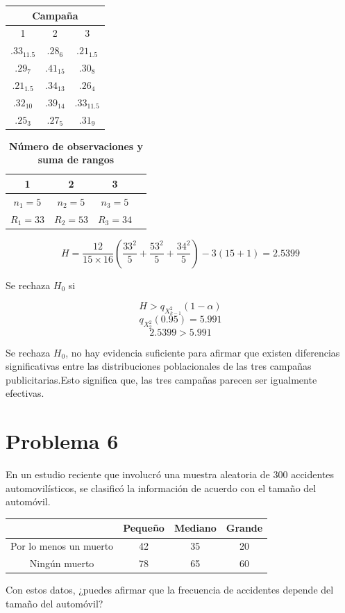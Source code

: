 \documentclass{article}
\begin{document}
\begin{center}
    \begin{tabular}{c |c |c}
        \multicolumn{3}{c}{Campaña}              \\
        \hline
        1            & 2          & 3            \\
        $.33_{11.5}$ & $.28_{6}$  & $.21_{1.5}$  \\
        $.29_{7}$    & $.41_{15}$ & $.30_{8}$    \\
        $.21_{1.5}$  & $.34_{13}$ & $.26_{4}$    \\
        $.32_{10}$   & $.39_{14}$ & $.33_{11.5}$ \\
        $.25_{3}$    & $.27_{5}$  & $.31_{9}$    \\
    \end{tabular}
\end{center}

\begin{table}[ht]
    \centering
    \caption{\textbf{Número de observaciones y suma de rangos}}
    \begin{tabular}{cccc}
        \toprule
        1          & 2          & 3          \\
        \midrule
        $n_1 = 5$  & $n_2 = 5$  & $n_3 = 5$  \\
        $R_1 = 33$ & $R_2 = 53$ & $R_3 = 34$ \\
        \bottomrule
    \end{tabular}
\end{table}

\[ H = \frac{12}{15 \times 16} \left(\frac{33^2}{5} + \frac{53^2}{5} + \frac{34^2}{5} \right) - 3(15 + 1) = 2.5399 \]

Se rechaza $H_0$ si

\[H > q_{X^{2}_{k-1}}(1 - \alpha)\]
\[q_{X^{2}_{2}}(0.95) = 5.991\]
\[2.5399 > 5.991\]

Se rechaza \(H_0\), no hay evidencia suficiente para afirmar que existen diferencias significativas entre las distribuciones poblacionales de las tres campañas publicitarias.Esto significa que, las tres campañas parecen ser igualmente efectivas.

\section{Problema 6}
En un estudio reciente que involucró una muestra aleatoria de 300 accidentes automovilísticos, se clasificó la información de acuerdo con el tamaño del automóvil.
\begin{center}
    \begin{tabular}{c| c c c}
                               & Pequeño & Mediano & Grande \\
        \hline
        Por lo menos un muerto & 42      & 35      & 20     \\
        Ningún muerto          & 78      & 65      & 60     \\
    \end{tabular}
\end{center}
Con estos datos,  ¿puedes afirmar que la frecuencia de accidentes depende del  tamaño del automóvil?
\end{document}
